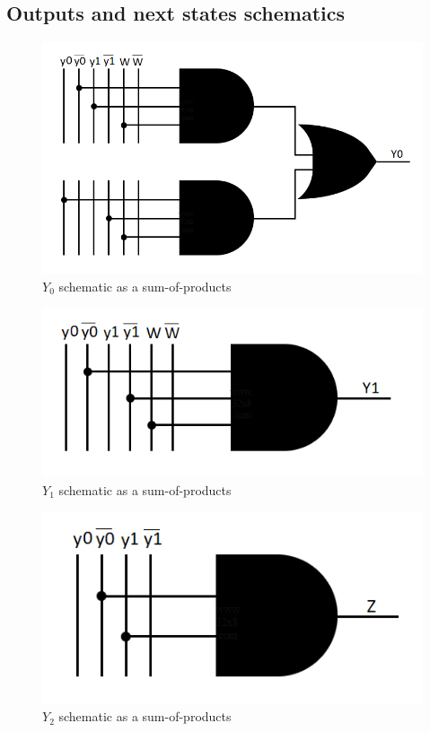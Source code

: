 \documentclass[../../e3_tp3_main.tex]{subfiles}
\begin{document}
\subsection{Outputs and next states schematics}
\begin{figure}[H]
	\centering
	\includegraphics{figures/Y0_schem_moore.PNG}
	\caption{$Y_0$ schematic as a sum-of-products}
\end{figure}
\begin{figure}[H]
	\centering
	\includegraphics{figures/Y1_schem_moore.PNG}
	\caption{$Y_1$ schematic as a sum-of-products}
\end{figure}
\begin{figure}[H]
	\centering
	\includegraphics{figures/Z_schem_moore.PNG}
	\caption{$Y_2$ schematic as a sum-of-products}
\end{figure}
\end{document}
